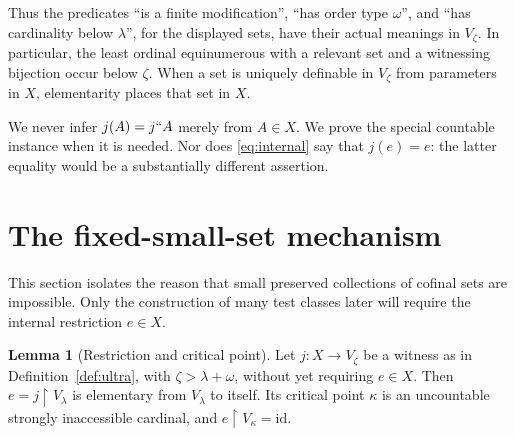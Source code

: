 \documentclass[11pt,letterpaper]{article}
\theoremstyle{definition}
\newtheorem{lemma}[definition]{Lemma}
\numberwithin{equation}{section}
\newcommand{\id}{\mathrm{id}}
\newcommand{\restr}{\mathbin{\upharpoonright}}
\begin{document}
Thus the predicates ``is a finite modification'', ``has order type $\omega$'', and ``has cardinality below $\lambda$'', for the displayed sets, have their actual meanings in $V_\zeta$. In particular, the least ordinal equinumerous with a relevant set and a witnessing bijection occur below $\zeta$. When a set is uniquely definable in $V_\zeta$ from parameters in $X$, elementarity places that set in $X$.

We never infer $j(A)=j``A$ merely from $A\in X$. We prove the special countable instance when it is needed. Nor does \eqref{eq:internal} say that $j(e)=e$: the latter equality would be a substantially different assertion.

\section{The fixed-small-set mechanism}\label{sec:small}

This section isolates the reason that small preserved collections of cofinal sets are impossible. Only the construction of many test classes later will require the internal restriction $e\in X$.

\begin{lemma}[Restriction and critical point]\label{lem:restriction}
Let $j:X\to V_\zeta$ be a witness as in Definition~\ref{def:ultra}, with $\zeta>\lambda+\omega$, without yet requiring $e\in X$. Then $e=j\restr V_\lambda$ is elementary from $V_\lambda$ to itself. Its critical point $\kappa$ is an uncountable strongly inaccessible cardinal, and $e\restr V_\kappa=\id$.
\end{lemma}
\end{document}
